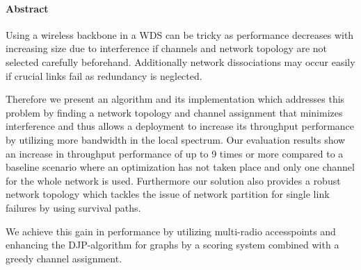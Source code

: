 \cleardoublepage

\vspace {2cm}
\begin{center}
\paragraph{Abstract}
\hrulefill
\end{center}
Using a wireless backbone in a \ac{WDS} can be tricky as performance decreases with increasing size due to interference if 
channels and network topology are not selected carefully beforehand. Additionally network dissociations may occur easily if 
crucial links fail as redundancy is neglected.

Therefore we present an algorithm and its implementation which addresses this problem by finding a network topology and channel assignment 
that minimizes interference and thus allows a deployment to increase its throughput performance by utilizing more bandwidth in the local spectrum. 
Our evaluation results show an increase in throughput performance of up to 9 times or more compared to a baseline scenario where an optimization has not taken place
and only one channel for the whole network is used.
Furthermore our solution also provides a robust network topology which tackles the issue of network partition for single link failures by using survival paths.

We achieve this gain in performance by utilizing multi-radio accesspoints and enhancing the \ac{DJP}-algorithm for graphs by a scoring system combined with
a greedy channel assignment.

